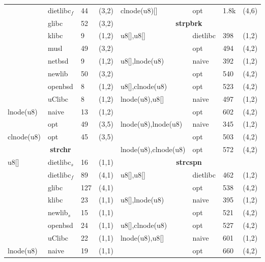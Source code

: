\begin{figure}[H]
\begin{center}
\begin{scriptsize}
\begin{tabular}{@{}l@{\hspace{5px}}l@{\hspace{5px}}l@{\hspace{5px}}cl@{\hspace{5px}}l@{\hspace{5px}}l@{\hspace{5px}}c@{}}
       & dietlibc$_f$ & 44 & (3,2) &           clnode(u8)[] & opt & 1.8k & (4,6) \\
       & glibc & 52 & (3,2) &                                \multicolumn{4}{c}{\bf strpbrk} \\
       & klibc & 9 & (1,2) &                                 u8[],u8[] & dietlibc & 398 & (1,2) \\
       & musl & 49 & (3,2) &                                 & opt      & 494 & (4,2) \\
       & netbsd & 9 & (1,2) &                                u8[],lnode(u8) & naive & 392 & (1,2) \\
       & newlib & 50 & (3,2) &                               & opt & 540 & (4,2) \\
       & openbsd & 8 & (1,2) &                               u8[],clnode(u8) & opt & 523 & (4,2) \\
       & uClibc & 8 & (1,2) &                                lnode(u8),u8[] & naive & 497 & (1,2) \\
lnode(u8) & naive & 13 & (1,2) &                             & opt & 602 & (4,2) \\
            & opt & 49 & (3,5) &                             lnode(u8),lnode(u8) & naive & 345 & (1,2) \\
clnode(u8) & opt & 45 & (3,5) &                              & opt & 503 & (4,2) \\
 \multicolumn{4}{c}{\bf strchr} &                            lnode(u8),clnode(u8) & opt & 572 & (4,2) \\
u8[] & dietlibc$_s$ & 16 & (1,1) &            \multicolumn{4}{c}{\bf strcspn} \\
       & dietlibc$_f$ & 89 & (4,1) &           u8[],u8[] & dietlibc & 462 & (1,2) \\
       & glibc & 127 & (4,1) &                               & opt      & 538 & (4,2) \\
       & klibc & 23 & (1,1) &                                u8[],lnode(u8) & naive & 395 & (1,2) \\
       & newlib$_s$ & 15 & (1,1) &            & opt & 521 & (4,2) \\
       & openbsd & 24 & (1,1) &                              u8[],clnode(u8) & opt & 527 & (4,2) \\
       & uClibc & 22 & (1,1) &                               lnode(u8),u8[] & naive & 601 & (1,2) \\
lnode(u8) & naive & 19 & (1,1) &                             & opt & 660 & (4,2) \\

\end{tabular}
\end{scriptsize}
\end{center}
\end{figure}
